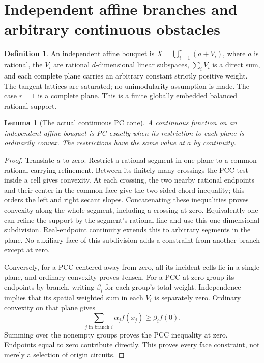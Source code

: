 \documentclass[11pt]{article}
\newtheorem{lemma}[theorem]{Lemma}
\theoremstyle{definition}\newtheorem{definition}[theorem]{Definition}
\theoremstyle{remark}\newtheorem{remark}[theorem]{Remark}
\begin{document}
\section{Independent affine branches and arbitrary continuous obstacles}
\begin{definition}
An independent affine bouquet is $X=\bigcup_{i=1}^r(a+V_i)$, where $a$ is rational, the $V_i$ are rational $d$-dimensional linear subspaces, $\sum_i V_i$ is a direct sum, and each complete plane carries an arbitrary constant strictly positive weight. The tangent lattices are saturated; no unimodularity assumption is made. The case $r=1$ is a complete plane. This is a finite globally embedded balanced rational support.
\end{definition}

\begin{lemma}[The actual continuous PC cone]\label{lem:branches}
A continuous function on an independent affine bouquet is PC exactly when its restriction to each plane is ordinarily convex. The restrictions have the same value at $a$ by continuity.
\end{lemma}
\begin{proof}
Translate $a$ to zero. Restrict a rational segment in one plane to a common rational carrying refinement. Between its finitely many crossings the PCC test inside a cell gives convexity. At each crossing, the two nearby rational endpoints and their center in the common face give the two-sided chord inequality; this orders the left and right secant slopes. Concatenating these inequalities proves convexity along the whole segment, including a crossing at zero. Equivalently one can refine the support by the segment's rational line and use this one-dimensional subdivision. Real-endpoint continuity extends this to arbitrary segments in the plane. No auxiliary face of this subdivision adds a constraint from another branch except at zero.

Conversely, for a PCC centered away from zero, all its incident cells lie in a single plane, and ordinary convexity proves Jensen. For a PCC at zero group its endpoints by branch, writing $\beta_i$ for each group's total weight. Independence implies that its spatial weighted sum in each $V_i$ is separately zero. Ordinary convexity on that plane gives
\[
 \sum_{j\text{ in branch }i}\alpha_j f(x_j)\geq\beta_i f(0).
\]
Summing over the nonempty groups proves the PCC inequality at zero. Endpoints equal to zero contribute directly. This proves every face constraint, not merely a selection of origin circuits.
\end{proof}
\end{document}
